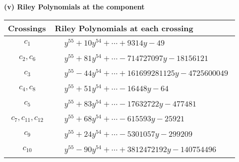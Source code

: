 \documentclass[1p]{elsarticle_modified}
\theoremstyle{definition}
\begin{document}
\newpage\renewcommand{\arraystretch}{1}
\flushleft \textbf{(v) Riley Polynomials at the component}\newline \\
\begin{tabular}{m{50pt}|m{274pt}}
Crossings & \hspace{64pt}Riley Polynomials at each crossing \\
\hline $$\begin{aligned}c_{1}\end{aligned}$$&$\begin{aligned}
&y^{55}+10 y^{54}+\cdots+9314 y-49
\end{aligned}$\\
\hline $$\begin{aligned}c_{2},c_{6}\end{aligned}$$&$\begin{aligned}
&y^{55}+81 y^{54}+\cdots-714727097 y-18156121
\end{aligned}$\\
\hline $$\begin{aligned}c_{3}\end{aligned}$$&$\begin{aligned}
&y^{55}-44 y^{54}+\cdots+161699281125 y-4725600049
\end{aligned}$\\
\hline $$\begin{aligned}c_{4},c_{8}\end{aligned}$$&$\begin{aligned}
&y^{55}+51 y^{54}+\cdots-16448 y-64
\end{aligned}$\\
\hline $$\begin{aligned}c_{5}\end{aligned}$$&$\begin{aligned}
&y^{55}+83 y^{54}+\cdots-17632722 y-477481
\end{aligned}$\\
\hline $$\begin{aligned}c_{7},c_{11},c_{12}\end{aligned}$$&$\begin{aligned}
&y^{55}+68 y^{54}+\cdots-615593 y-25921
\end{aligned}$\\
\hline $$\begin{aligned}c_{9}\end{aligned}$$&$\begin{aligned}
&y^{55}+24 y^{54}+\cdots-5301057 y-299209
\end{aligned}$\\
\hline $$\begin{aligned}c_{10}\end{aligned}$$&$\begin{aligned}
&y^{55}-90 y^{54}+\cdots+3812472192 y-140754496
\end{aligned}$\\
\hline
\end{tabular}\\~\\
\end{document}
